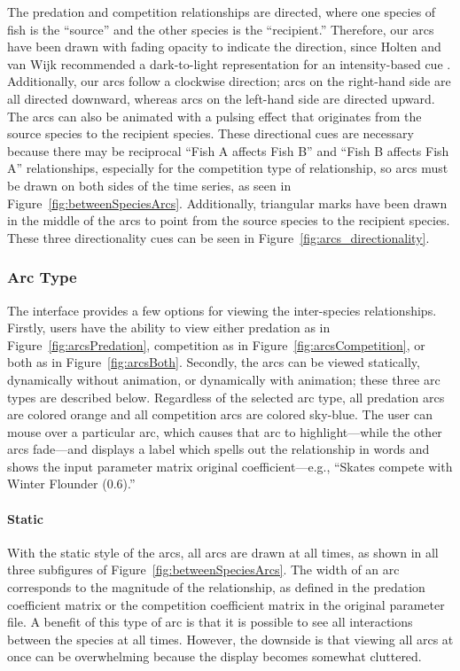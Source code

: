The predation and competition relationships are directed, where one species of fish is the ``source'' and the other species is the ``recipient.''  Therefore, our arcs have been drawn with fading opacity to indicate the direction, since Holten and van Wijk recommended a dark-to-light representation for an intensity-based cue \cite{holten2009}.  Additionally, our arcs follow a clockwise direction; arcs on the right-hand side are all directed downward, whereas arcs on the left-hand side are directed upward.  The arcs can also be animated with a pulsing effect that originates from the source species to the recipient species.  These directional cues are necessary because there may be reciprocal ``Fish A affects Fish B'' and ``Fish B affects Fish A'' relationships, especially for the competition type of relationship, so arcs must be drawn on both sides of the time series, as seen in Figure~\ref{fig:betweenSpeciesArcs}.  Additionally, triangular marks have been drawn in the middle of the arcs to point from the source species to the recipient species.  These three directionality cues can be seen in Figure~\ref{fig:arcs_directionality}.

\subsubsection{Arc Type}

The interface provides a few options for viewing the inter-species relationships.  Firstly, users have the ability to view either predation as in Figure~\ref{fig:arcsPredation}, competition as in Figure~\ref{fig:arcsCompetition}, or both as in Figure~\ref{fig:arcsBoth}.  Secondly, the arcs can be viewed statically, dynamically without animation, or dynamically with animation; these three arc types are described below.  Regardless of the selected arc type, all predation arcs are colored orange and all competition arcs are colored sky-blue.  The user can mouse over a particular arc, which causes that arc to highlight---while the other arcs fade---and displays a label which spells out the relationship in words and shows the input parameter matrix original coefficient---e.g., ``Skates compete with Winter Flounder (0.6).''

\paragraph{Static}

With the static style of the arcs, all arcs are drawn at all times, as shown in all three subfigures of Figure~\ref{fig:betweenSpeciesArcs}.  The width of an arc corresponds to the magnitude of the relationship, as defined in the predation coefficient matrix or the competition coefficient matrix in the original parameter file.   A benefit of this type of arc is that it is possible to see all interactions between the species at all times.  However, the downside is that viewing all arcs at once can be overwhelming because the display becomes somewhat cluttered.

